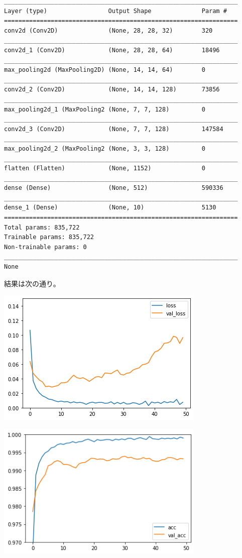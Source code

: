 \documentclass[platex,dvipdfmx]{jsarticle}
\begin{document}
\begin{lstlisting}
_________________________________________________________________
Layer (type)                 Output Shape              Param #   
=================================================================
conv2d (Conv2D)              (None, 28, 28, 32)        320       
_________________________________________________________________
conv2d_1 (Conv2D)            (None, 28, 28, 64)        18496     
_________________________________________________________________
max_pooling2d (MaxPooling2D) (None, 14, 14, 64)        0         
_________________________________________________________________
conv2d_2 (Conv2D)            (None, 14, 14, 128)       73856     
_________________________________________________________________
max_pooling2d_1 (MaxPooling2 (None, 7, 7, 128)         0         
_________________________________________________________________
conv2d_3 (Conv2D)            (None, 7, 7, 128)         147584    
_________________________________________________________________
max_pooling2d_2 (MaxPooling2 (None, 3, 3, 128)         0         
_________________________________________________________________
flatten (Flatten)            (None, 1152)              0         
_________________________________________________________________
dense (Dense)                (None, 512)               590336    
_________________________________________________________________
dense_1 (Dense)              (None, 10)                5130      
=================================================================
Total params: 835,722
Trainable params: 835,722
Non-trainable params: 0
_________________________________________________________________
None
\end{lstlisting}

結果は次の通り。

\includegraphics[width=10cm]{b1100.png}

\includegraphics[width=10cm]{b1100_acc.png}
\end{document}
